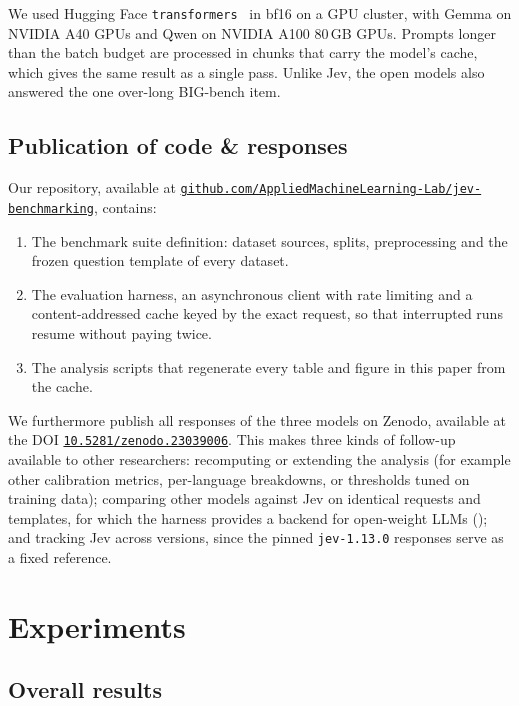 \documentclass[table]{article}
\begin{document}
We used Hugging Face \texttt{transformers}~\cite{wolf-etal-2020-transformers} in bf16 on a GPU cluster, with Gemma on NVIDIA A40 GPUs and Qwen on NVIDIA A100 80\,GB GPUs. Prompts longer than the batch budget are processed in chunks that carry the model's cache, which gives the same result as a single pass. Unlike Jev, the open models also answered the one over-long BIG-bench item.


\subsection{Publication of code \& responses}
\label{sec:resource}

Our repository, available at \href{https://github.com/AppliedMachineLearning-Lab/jev-benchmarking}{\texttt{github.com/AppliedMachineLearning-Lab/jev-benchmarking}}, contains: 

\begin{enumerate}
    \item The benchmark suite definition: dataset sources, splits, preprocessing and the frozen question template of every dataset.
    \item The evaluation harness, an asynchronous client with rate limiting and a content-addressed cache keyed by the exact request, so that interrupted runs resume without paying twice.
    \item The analysis scripts that regenerate every table and figure in this paper from the cache.
\end{enumerate}

We furthermore publish all responses of the three models on Zenodo, available at the DOI \href{https://doi.org/10.5281/zenodo.23039006}{\texttt{10.5281/zenodo.23039006}}. This makes three kinds of follow-up available to other researchers: recomputing or extending the analysis (for example other calibration metrics, per-language breakdowns, or thresholds tuned on training data); comparing other models against Jev on identical requests and templates, for which the harness provides a backend for open-weight LLMs (); and tracking Jev across versions, since the pinned \texttt{jev-1.13.0} responses serve as a fixed reference.

\section{Experiments}

\subsection{Overall results}
\end{document}
